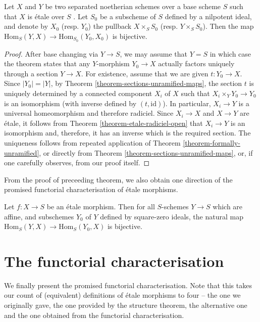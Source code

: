 \begin{theorem}
\label{theorem-etale-topological}
Let $X$ and $Y$ be two separated noetherian schemes over a base scheme $S$
such that $X$ is \'etale over $S$ . Let $S_0$ be a subscheme of $S$ defined
by a nilpotent ideal, and denote by $X_0$ (resp. $Y_0$) the pullback
$X \times_S S_0$ (resp. $Y \times_S S_0$). Then the map
$\text{Hom}_S(Y, X) \to \text{Hom}_{S_0}(Y_0, X_0)$ is bijective.
\end{theorem}

\begin{proof}
After base changing via $Y \to S$, we may assume that $Y = S$ in which case
the theorem states that any $Y$-morphism $Y_0 \to X$ actually factors
uniquely through a section $Y \to X$. For existence, assume that we are
given $t : Y_0 \to X$. Since $|Y_0| = |Y|$, by Theorem
\ref{theorem-sections-unramified-maps}, the section $t$ is uniquely
determined by a connected component $X_i$ of $X$ such that
$X_i \times_Y Y_0 \to Y_0$ is an isomorphism (with inverse defined by
$(t, \mathrm{id})$). In particular, $X_i \to Y$ is a universal homeomorphism
and therefore radiciel. Since $X_i \to X$ and $X \to Y$ are \'etale, it
follows from Theorem \ref{theorem-etale-radiciel-open} that $X_i \to Y$ is an
isomorphism and, therefore, it has an inverse which is the required section.
The uniqueness follows from repeated application of Theorem
\ref{theorem-formally-unramified}, or directly from Theorem
\ref{theorem-sections-unramified-maps}, or, if one carefully observes,
from our proof itself.
\end{proof}

\noindent
From the proof of preceeding theorem, we also obtain one direction of the
promised functorial characterisation of \'etale morphisms.

\begin{theorem}
\label{theorem-formally-etale-step-0}
Let $f : X \to S$ be an \'etale morphism. Then for all $S$-schemes $Y \to S$
which are affine, and subschemes $Y_0$ of $Y$ defined by square-zero ideals,
the natural map $\text{Hom}_S(Y, X) \to \text{Hom}_S(Y_0, X)$ is bijective.
\end{theorem}

\section{The functorial characterisation}
\label{section-functorial-etale}

\noindent
We finally present the promised functorial characterisation. Note that this
takes our count of (equivalent) definitions of \'etale morphisms to four --
the one we originally gave, the one provided by the structure theorem, the
alternative one and the one obtained from the functorial characterisation.

